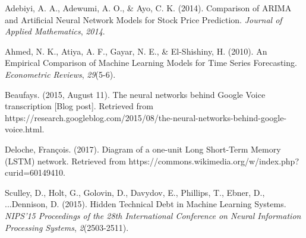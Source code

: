 \documentclass[11pt, oneside]{article}
\begin{document}
\begin{thebibliography}{9}





  Adebiyi, A. A., Adewumi, A. O., \& Ayo, C. K. (2014). Comparison of ARIMA and Artificial Neural Network Models for Stock Price Prediction. \textit{Journal of Applied Mathematics}, \textit{2014}.

  Ahmed, N. K., Atiya, A. F., Gayar, N. E., \& El-Shishiny, H. (2010). An Empirical Comparison of Machine Learning Models for Time Series Forecasting. \textit{Econometric Reviews}, \textit{29}(5-6).

  Beaufays. (2015, August 11). The neural networks behind Google Voice transcription [Blog post]. Retrieved from https://research.googleblog.com/2015/08/the-neural-networks-behind-google-voice.html.

  Deloche, Fran\c{c}ois. (2017). Diagram of a one-unit Long Short-Term Memory (LSTM) network. Retrieved from https://commons.wikimedia.org/w/index.php?curid=60149410.

  Sculley, D., Holt, G., Golovin, D., Davydov, E., Phillips, T., Ebner, D., ...Dennison, D. (2015). Hidden Technical Debt in Machine Learning Systems. \textit{NIPS'15 Proceedings of the 28th International Conference on Neural Information Processing Systems}, \textit{2}(2503-2511).
\end{thebibliography}
\end{document}
